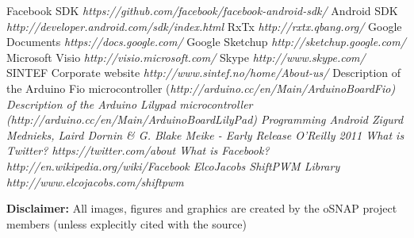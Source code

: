 \begin{thebibliography}{99}
 Facebook SDK {\em https://github.com/facebook/facebook-android-sdk/}
 Android SDK {\em http://developer.android.com/sdk/index.html}
 RxTx {\em http://rxtx.qbang.org/}
 Google Documents {\em https://docs.google.com/}
 Google Sketchup {\em http://sketchup.google.com/}
 Microsoft Visio {\em http://visio.microsoft.com/}
 Skype {\em http://www.skype.com/}
 SINTEF Corporate website {\em http://www.sintef.no/home/About-us/}
 Description of the Arduino Fio microcontroller (\em http://arduino.cc/en/Main/ArduinoBoardFio)
  Description of the Arduino Lilypad microcontroller (\em http://arduino.cc/en/Main/ArduinoBoardLilyPad)
 Programming Android {\em Zigurd Mednieks, Laird Dornin \& G. Blake Meike - Early Release O'Reilly 2011}
 What is Twitter? {\em https://twitter.com/about}
 What is Facebook? {\em http://en.wikipedia.org/wiki/Facebook}
 ElcoJacobs ShiftPWM Library {\em http://www.elcojacobs.com/shiftpwm}
\end{thebibliography}


\textbf{Disclaimer:}
All images, figures and graphics are created by the oSNAP project members (unless explecitly cited with the source)
